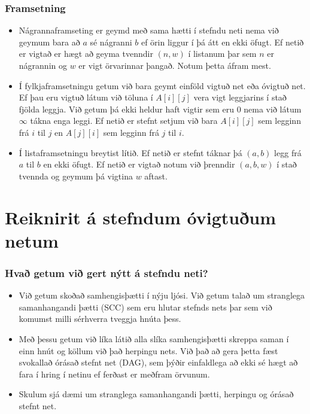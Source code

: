 \documentclass{beamer}
\begin{document}
\begin{frame}
\frametitle{Framsetning}

\begin{itemize}

\item<1-> Nágrannaframseting er geymd með sama hætti í stefndu neti nema við geymum bara að $a$ sé nágranni $b$ ef örin liggur í þá átt en ekki öfugt. Ef netið er vigtað er hægt að geyma tvenndir $(n, w)$ í listanum þar sem $n$ er nágrannin og $w$ er vigt örvarinnar þangað. Notum þetta áfram mest.

\item<2-> Í fylkjaframsetningu getum við bara geymt einföld vigtuð net eða óvigtuð net. Ef þau eru vigtuð látum við töluna í $A[i][j]$ vera vigt leggjarins í stað fjölda leggja. Við getum þá ekki heldur haft vigtir sem eru 0 nema við látum $\infty$ tákna enga leggi. Ef netið er stefnt setjum við bara $A[i][j]$ sem legginn frá $i$ til $j$ en $A[j][i]$ sem legginn frá $j$ til $i$.

\item<3-> Í listaframsetningu breytist lítið. Ef netið er stefnt táknar þá $(a, b)$ legg frá $a$ til $b$ en ekki öfugt. Ef netið er vigtað notum við þrenndir $(a, b, w)$ í stað tvennda og geymum þá vigtina $w$ aftast.

\end{itemize}

\end{frame}

\section[Reiknirit á stefndum óvigtuðum netum]{Reiknirit á stefndum óvigtuðum netum}

\begin{frame}
\frametitle{Hvað getum við gert nýtt á stefndu neti?}

\begin{itemize}

\item<1-> Við getum skoðað samhengisþætti í nýju ljósi. Við getum talað um stranglega samanhangandi þætti (SCC) sem eru hlutar stefnds nets þar sem við komumst milli sérhverra tveggja hnúta þess.

\item<2-> Með þessu getum við líka látið alla slíka samhengisþætti skreppa saman í einn hnút og köllum við það herpingu nets. Við það að gera þetta fæst svokallað órásað stefnt net (DAG), sem þýðir einfaldlega að ekki sé hægt að fara í hring í netinu ef ferðast er meðfram örvunum.

\item<3-> Skulum sjá dæmi um stranglega samanhangandi þætti, herpingu og órásað stefnt net.

\end{itemize}

\end{frame}
\end{document}
